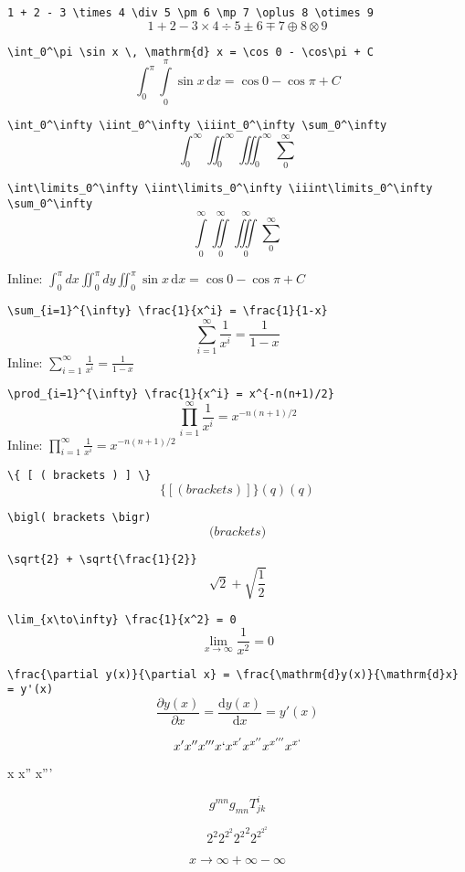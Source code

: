 \documentclass{article}
\begin{document}
\verb|1 + 2 - 3 \times 4 \div 5 \pm 6 \mp 7 \oplus 8 \otimes 9|
\[ 1 + 2 - 3 \times 4 \div 5 \pm 6 \mp 7 \oplus 8 \otimes 9 \]

\verb|\int_0^\pi \sin x \, \mathrm{d} x = \cos 0 - \cos\pi + C|
\[ \int_0^\pi \int\limits_0^\pi \sin x \, \mathrm{d} x = \cos 0 - \cos\pi + C \]

\verb|\int_0^\infty \iint_0^\infty \iiint_0^\infty \sum_0^\infty|
\[ \int_0^\infty \iint_0^\infty \iiint_0^\infty \sum_0^\infty \]

\verb|\int\limits_0^\infty \iint\limits_0^\infty \iiint\limits_0^\infty \sum_0^\infty|
\[ \int\limits_0^\infty \iint\limits_0^\infty \iiint\limits_0^\infty \sum_0^\infty \]

Inline: $\int_0^\pi dx \iint_0^\pi dy \iint_0^\pi \sin x \, \mathrm{d} x = \cos 0 - \cos\pi + C$

\verb|\sum_{i=1}^{\infty} \frac{1}{x^i} = \frac{1}{1-x}|
\[ \sum_{i=1}^{\infty} \frac{1}{x^i} = \frac{1}{1-x} \]
Inline: $\sum_{i=1}^{\infty} \frac{1}{x^i} = \frac{1}{1-x}$

\verb|\prod_{i=1}^{\infty} \frac{1}{x^i} = x^{-n(n+1)/2}|
\[ \prod_{i=1}^{\infty} \frac{1}{x^i} = x^{-n(n+1)/2} \]
Inline: $\prod_{i=1}^{\infty} \frac{1}{x^i} = x^{-n(n+1)/2}$

\verb|\{ [ ( brackets ) ] \}|
\[ \{ [ ( brackets ) ] \} (q) \left( q \right) \]

\verb|\bigl( brackets \bigr)|
\[ \bigl( brackets \bigr) \]

\verb|\sqrt{2} + \sqrt{\frac{1}{2}}|
\[ \sqrt{2} + \sqrt{\frac{1}{2}} \]

\verb|\lim_{x\to\infty} \frac{1}{x^2} = 0|
\[ \lim_{x\to\infty} \frac{1}{x^2} = 0 \]

\verb|\frac{\partial y(x)}{\partial x} = \frac{\mathrm{d}y(x)}{\mathrm{d}x} = y'(x)|
\[ \frac{\partial y(x)}{\partial x} = \frac{\mathrm{d}y(x)}{\mathrm{d}x} = y'(x) \]

\[ x' x'' x''' x` x^{x'} x^{x''} x^{x'''} x^{x`}\]

{\firatext x x'' x'''}


\[ g^{mn} g_{mn} T^{i}_{jk} \]

\[ 2^2 2^{2^2} {2^2}^2 2^{2^{2^2}} \]

\[ x \to \infty + \infty - \infty \]
\end{document}
